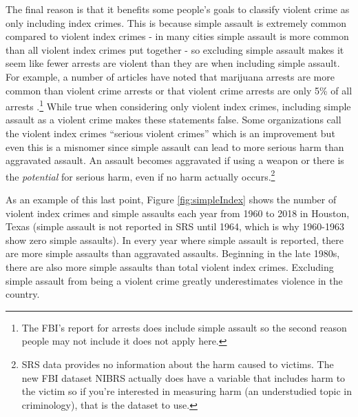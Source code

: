 \documentclass[
]{krantz}
\begin{document}
The final reason is that it benefits some people's goals to
classify violent crime as only including index crimes. This
is because simple assault is extremely common compared to
violent index crimes - in many cities simple assault is more
common than all violent index crimes put together - so
excluding simple assault makes it seem like fewer arrests
are violent than they are when including simple assault. For
example, a number of articles have noted that marijuana
arrests are more common than violent crime arrests
\citep{ingraham2016, kertscher2019, devito2020, earlenbaugh2020, aclu2020}
or that violent crime arrests are only 5\% of all arrests
\citep{neusteter2019every, speri2019}.\footnote{The FBI's
  report for arrests does include simple assault so the
  second reason people may not include it does not apply
  here.} While true when considering only violent index
crimes, including simple assault as a violent crime makes
these statements false. Some organizations call the violent
index crimes ``serious violent crimes'' which is an
improvement but even this is a misnomer since simple assault
can lead to more serious harm than aggravated assault. An
assault becomes aggravated if using a weapon or there is the
\emph{potential} for serious harm, even if no harm actually
occurs.\footnote{SRS data provides no information about the
  harm caused to victims. The new FBI dataset NIBRS actually
  does have a variable that includes harm to the victim so
  if you're interested in measuring harm (an understudied
  topic in criminology), that is the dataset to use.}

As an example of this last point, Figure
\ref{fig:simpleIndex} shows the number of violent index
crimes and simple assaults each year from 1960 to 2018 in
Houston, Texas (simple assault is not reported in SRS until
1964, which is why 1960-1963 show zero simple assaults). In
every year where simple assault is reported, there are more
simple assaults than aggravated assaults. Beginning in the
late 1980s, there are also more simple assaults than total
violent index crimes. Excluding simple assault from being a
violent crime greatly underestimates violence in the
country.
\end{document}
